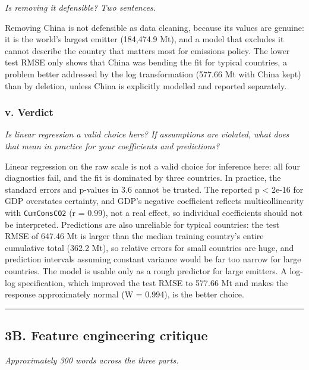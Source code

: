 \documentclass[
]{article}
\begin{document}
\emph{Is removing it defensible? Two sentences.}

Removing China is not defensible as data cleaning, because its values
are genuine: it is the world's largest emitter (184,474.9 Mt), and a
model that excludes it cannot describe the country that matters most for
emissions policy. The lower test RMSE only shows that China was bending
the fit for typical countries, a problem better addressed by the log
transformation (577.66 Mt with China kept) than by deletion, unless
China is explicitly modelled and reported separately.

\subsubsection{v. Verdict}\label{v.-verdict}

\emph{Is linear regression a valid choice here? If assumptions are
violated, what does that mean in practice for your coefficients and
predictions?}

Linear regression on the raw scale is not a valid choice for inference
here: all four diagnostics fail, and the fit is dominated by three
countries. In practice, the standard errors and p-values in 3.6 cannot
be trusted. The reported p \textless{} 2e-16 for GDP overstates
certainty, and GDP's negative coefficient reflects multicollinearity
with \texttt{CumConsCO2} (r = 0.99), not a real effect, so individual
coefficients should not be interpreted. Predictions are also unreliable
for typical countries: the test RMSE of 647.46 Mt is larger than the
median training country's entire cumulative total (362.2 Mt), so
relative errors for small countries are huge, and prediction intervals
assuming constant variance would be far too narrow for large countries.
The model is usable only as a rough predictor for large emitters. A
log-log specification, which improved the test RMSE to 577.66 Mt and
makes the response approximately normal (W = 0.994), is the better
choice.

\begin{center}\rule{0.5\linewidth}{0.5pt}\end{center}

\subsection{3B. Feature engineering
critique}\label{b.-feature-engineering-critique}

\emph{Approximately 300 words across the three parts.}
\end{document}
